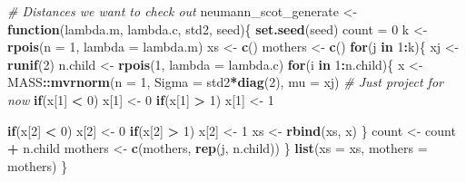 \documentclass[
]{article}
\newenvironment{Shaded}{\begin{snugshade}}{\end{snugshade}}
\newcommand{\CommentTok}[1]{\textcolor[rgb]{0.56,0.35,0.01}{\textit{#1}}}
\newcommand{\ControlFlowTok}[1]{\textcolor[rgb]{0.13,0.29,0.53}{\textbf{#1}}}
\newcommand{\DataTypeTok}[1]{\textcolor[rgb]{0.13,0.29,0.53}{#1}}
\newcommand{\DecValTok}[1]{\textcolor[rgb]{0.00,0.00,0.81}{#1}}
\newcommand{\KeywordTok}[1]{\textcolor[rgb]{0.13,0.29,0.53}{\textbf{#1}}}
\newcommand{\NormalTok}[1]{#1}
\newcommand{\OperatorTok}[1]{\textcolor[rgb]{0.81,0.36,0.00}{\textbf{#1}}}
\newcommand{\StringTok}[1]{\textcolor[rgb]{0.31,0.60,0.02}{#1}}
\begin{document}
\begin{Shaded}
\begin{Highlighting}[]
\CommentTok{# Distances we want to check out }
\NormalTok{neumann_scot_generate <-}\StringTok{ }\ControlFlowTok{function}\NormalTok{(lambda.m, lambda.c, std2, seed)\{}
  \KeywordTok{set.seed}\NormalTok{(seed)}
\NormalTok{  count =}\StringTok{ }\DecValTok{0}
\NormalTok{  k <-}\StringTok{ }\KeywordTok{rpois}\NormalTok{(}\DataTypeTok{n =} \DecValTok{1}\NormalTok{, }\DataTypeTok{lambda =}\NormalTok{ lambda.m)}
\NormalTok{  xs <-}\StringTok{ }\KeywordTok{c}\NormalTok{()}
\NormalTok{  mothers <-}\StringTok{ }\KeywordTok{c}\NormalTok{()}
  \ControlFlowTok{for}\NormalTok{(j }\ControlFlowTok{in} \DecValTok{1}\OperatorTok{:}\NormalTok{k)\{}
\NormalTok{    xj <-}\StringTok{ }\KeywordTok{runif}\NormalTok{(}\DecValTok{2}\NormalTok{)}
\NormalTok{    n.child <-}\StringTok{ }\KeywordTok{rpois}\NormalTok{(}\DecValTok{1}\NormalTok{, }\DataTypeTok{lambda =}\NormalTok{ lambda.c)}
    \ControlFlowTok{for}\NormalTok{(i }\ControlFlowTok{in} \DecValTok{1}\OperatorTok{:}\NormalTok{n.child)\{}
\NormalTok{      x <-}\StringTok{ }\NormalTok{MASS}\OperatorTok{::}\KeywordTok{mvrnorm}\NormalTok{(}\DataTypeTok{n =} \DecValTok{1}\NormalTok{, }\DataTypeTok{Sigma =}\NormalTok{ std2}\OperatorTok{*}\KeywordTok{diag}\NormalTok{(}\DecValTok{2}\NormalTok{), }\DataTypeTok{mu =}\NormalTok{ xj)}
      \CommentTok{# Just project for now}
      \ControlFlowTok{if}\NormalTok{(x[}\DecValTok{1}\NormalTok{] }\OperatorTok{<}\StringTok{ }\DecValTok{0}\NormalTok{) x[}\DecValTok{1}\NormalTok{] <-}\StringTok{ }\DecValTok{0} 
      \ControlFlowTok{if}\NormalTok{(x[}\DecValTok{1}\NormalTok{] }\OperatorTok{>}\StringTok{ }\DecValTok{1}\NormalTok{) x[}\DecValTok{1}\NormalTok{] <-}\StringTok{ }\DecValTok{1}
      
      \ControlFlowTok{if}\NormalTok{(x[}\DecValTok{2}\NormalTok{] }\OperatorTok{<}\StringTok{ }\DecValTok{0}\NormalTok{) x[}\DecValTok{2}\NormalTok{] <-}\StringTok{ }\DecValTok{0} 
      \ControlFlowTok{if}\NormalTok{(x[}\DecValTok{2}\NormalTok{] }\OperatorTok{>}\StringTok{ }\DecValTok{1}\NormalTok{) x[}\DecValTok{2}\NormalTok{] <-}\StringTok{ }\DecValTok{1}
\NormalTok{      xs <-}\StringTok{ }\KeywordTok{rbind}\NormalTok{(xs, x)}
\NormalTok{    \}}
\NormalTok{    count <-}\StringTok{ }\NormalTok{count }\OperatorTok{+}\StringTok{ }\NormalTok{n.child}
\NormalTok{    mothers <-}\StringTok{ }\KeywordTok{c}\NormalTok{(mothers, }\KeywordTok{rep}\NormalTok{(j, n.child))}
\NormalTok{  \}}
  \KeywordTok{list}\NormalTok{(}\DataTypeTok{xs =}\NormalTok{ xs, }\DataTypeTok{mothers =}\NormalTok{ mothers) }
\NormalTok{\}}


\end{Highlighting}
\end{Shaded}
\end{document}
